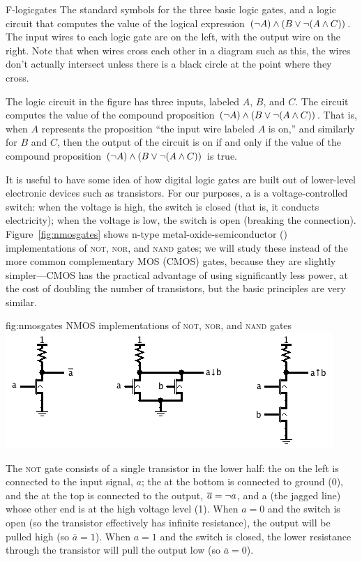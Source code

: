 \fig
   {F-logicgates}
   {The standard symbols for the three basic logic gates, and a
    logic circuit that computes the value of the logical
    expression $(\lnot A)\wedge(B\vee\lnot(A\wedge C))$.  The input wires to
    each logic gate are on the left, with the output wire on the
    right.  Note that when wires cross each other in a diagram
    such as this, the wires don't actually intersect unless
    there is a black circle at the point where they cross.}
   {  }
   

The logic circuit in the figure has three inputs, labeled
$A$, $B$, and $C$.  The circuit computes the value of the
compound proposition $(\lnot A)\wedge(B\vee\lnot(A\wedge C))$.
That is, when $A$ represents the proposition ``the input wire
labeled $A$ is on,'' and similarly for $B$ and $C$, then
the output of the circuit is on if and only if the
value of the compound proposition $(\lnot A)\wedge(B\vee\lnot(A\wedge C))$
is true.

\medskip

It is useful to have some idea of how digital logic gates are built out of
lower-level electronic devices such as transistors. For our purposes, a
 is a voltage-controlled switch: when the voltage is high,
the switch is closed (that is, it conducts electricity); when the voltage
is low, the switch is open (breaking the connection). Figure~\ref{fig:nmosgates}
shows n-type metal-oxide-semiconductor () implementations of
\textsc{not}, \textsc{nor}, and \textsc{nand} gates; we will study these
instead of the more common complementary MOS (CMOS) gates, because they are
slightly simpler---CMOS has the practical advantage of using significantly
less power, at the cost of doubling the number of transistors, but the basic
principles are very similar.

\fig
	{fig:nmosgates}
	{NMOS implementations of \textsc{not}, \textsc{nor}, and \textsc{nand} gates}
	{\includegraphics[width=!,height=!,scale=0.75]{graphics/NMOSgates.png}}

The \textsc{not} gate consists of a single transistor in the lower half:
the  on the left is connected to the input signal, $a$; the 
at the bottom is connected to ground (0), and the  at the top is connected
to the output, $\overline{a}=\lnot a$, and a  (the jagged line) whose
other end is at the high voltage level (1). When $a=0$ and the switch is open (so the
transistor effectively has infinite resistance), the output will be pulled high
(so $\overline{a}=1$). When $a=1$ and the switch is closed, the lower resistance
through the transistor will pull the output low (so $\overline{a}=0$).

